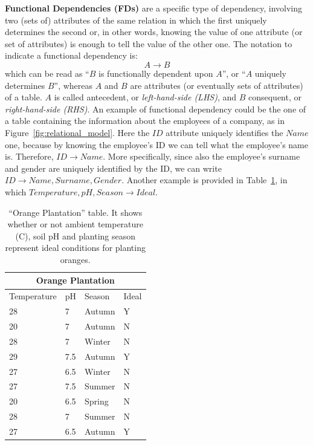 \textbf{Functional Dependencies (FDs)} are a specific type of dependency, involving two (sets of) attributes of the same relation in which the first uniquely determines the second or, in other words, knowing the value of one attribute (or set of attributes) is enough to tell the value of the other one. The notation to indicate a functional dependency is: \[A \rightarrow B\] which can be read as ``\(B\) is functionally dependent upon \(A\)'', or ``\(A\) uniquely determines \(B\)'', whereas \(A\) and \(B\) are attributes (or eventually sets of attributes) of a table. \(A\) is called antecedent, or \textit{left-hand-side (LHS)}, and \(B\) consequent, or \textit{right-hand-side (RHS)}. An example of functional dependency could be the one of a table containing the information about the employees of a company, as in Figure~\ref{fig:relational_model}. Here the \(\mathit{ID}\) attribute uniquely identifies the \(\mathit{Name}\) one, because by knowing the employee's ID we can tell what the employee's name is. Therefore, \(\mathit{ID} \rightarrow \mathit{Name}\). More specifically, since also the employee's surname and gender are uniquely identified by the ID, we can write \(\mathit{ID} \rightarrow \mathit{Name}, \mathit{Surname}, \mathit{Gender}\). Another example is provided in Table~\ref{table:orange_plantation}, in which \(\mathit{Temperature}, \mathit{pH}, \mathit{Season} \rightarrow \mathit{Ideal}\).

\begin{table}
\begin{tabular}{|p{2.5cm}|p{2.5cm}|p{2.5cm}|p{2.5cm}|}
\hline
\multicolumn{4}{|c|}{Orange Plantation}\\
\hline
Temperature & pH & Season & Ideal\\
\hline
28 & 7 & Autumn & Y\\
20 & 7 & Autumn & N\\
28 & 7 & Winter & N\\
29 & 7.5 & Autumn & Y\\
27 & 6.5 & Winter & N\\
27 & 7.5 & Summer & N\\
20 & 6.5 & Spring & N\\
28 & 7 & Summer & N\\
27 & 6.5 & Autumn & Y\\
\hline
\end{tabular}
\centering
\caption{``Orange Plantation'' table. It shows whether or not ambient temperature (\textdegree C), soil pH and planting season represent ideal conditions for planting oranges.}
\label{table:orange_plantation}
\end{table}

